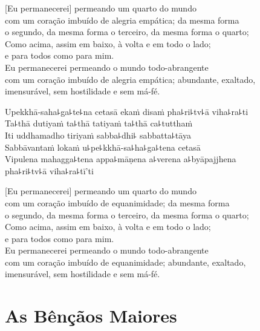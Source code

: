 [Eu permanecerei] permeando um quarto do mundo\\
\vin com um coração imbuído de alegria empática; da mesma forma\\
\vin o segundo, da mesma forma o terceiro, da mesma forma o quarto;\\
Como acima, assim em baixo, à volta e em todo o lado;\\
\vin e para todos como para mim.\\
Eu permanecerei permeando o mundo todo-abrangente\\
\vin com um coração imbuído de alegria empática; abundante, exaltado,\\
\vin imensurável, sem hostilidade e sem má-fé.

\clearpage

Upekkhā-saha꜕ga꜕te꜕na cetasā ekaṁ disaṁ pha꜕ri꜕tv꜕ā viha꜕ra꜕ti\\
Ta꜕thā dutiyaṁ ta꜕thā tatiyaṁ ta꜕thā ca꜕tutthaṁ\\
Iti uddhamadho tiriyaṁ sabba꜕dhi꜕ sabbatta꜕tāya\\
Sabbāvantaṁ lokaṁ u꜕pe꜕kkhā-sa꜕ha꜕ga꜕tena cetasā\\
Vipulena mahagga꜕tena appa꜕māṇena a꜕verena a꜕byāpajjhena\\
\vin pha꜕ri꜕tv꜕ā viha꜕ra꜕tī'ti

\clearpage

[Eu permanecerei] permeando um quarto do mundo\\
\vin com um coração imbuído de equanimidade; da mesma forma\\
\vin o segundo, da mesma forma o terceiro, da mesma forma o quarto;\\
Como acima, assim em baixo, à volta e em todo o lado;\\
\vin e para todos como para mim.\\
Eu permanecerei permeando o mundo todo-abrangente\\
\vin com um coração imbuído de equanimidade; abundante, exaltado,\\
\vin imensurável, sem hostilidade e sem má-fé.

\chapter{As Bênçãos Maiores}


\begin{leader}
\end{leader}

